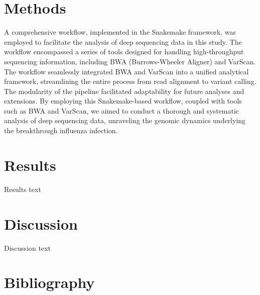 \documentclass{scrartcl}
\begin{document}
\section{Methods}
A comprehensive workflow, implemented in the Snakemake framework, was employed to facilitate the analysis of deep sequencing data in this study. The workflow encompassed a series of tools designed for handling high-throughput sequencing information, including BWA (Burrows-Wheeler Aligner) and VarScan.
The workflow seamlessly integrated BWA and VarScan into a unified analytical framework, streamlining the entire process from read alignment to variant calling.
The modularity of the pipeline facilitated adaptability for future analyses and extensions.
By employing this Snakemake-based workflow, coupled with tools such as BWA and VarScan, we aimed to conduct a thorough and systematic analysis of deep sequencing data, unraveling the genomic dynamics underlying the breakthrough influenza infection.

\section{Results}
Results text

\section{Discussion}
Discussion text

\newpage
\section{Bibliography}


\end{document}

